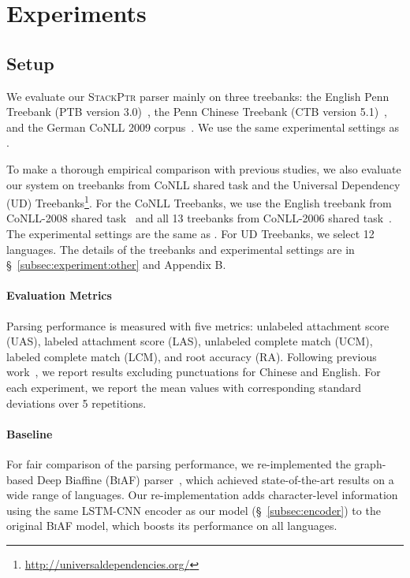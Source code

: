 \documentclass[11pt,a4paper]{article}
\begin{document}
\section{Experiments}\label{sec:experiment}
\subsection{Setup}
We evaluate our \textsc{StackPtr} parser mainly on three treebanks: the English Penn Treebank (PTB version 3.0)~\citep{Marcus:1993}, the Penn Chinese Treebank (CTB version 5.1)~\cite{xue2002building}, and the German CoNLL 2009 corpus~\cite{hajivc2009conll}.
We use the same experimental settings as \citet{kuncoro-EtAl:2016:EMNLP2016}.

To make a thorough empirical comparison with previous studies, we also evaluate our system on treebanks  from CoNLL shared task and the Universal Dependency (UD) Treebanks\footnote{\url{http://universaldependencies.org/}}. 
For the CoNLL Treebanks, we use the English treebank from CoNLL-2008 shared task~\cite{surdeanu2008conll} and all 13 treebanks from CoNLL-2006 shared task~\cite{Buchholz:2006}.
The experimental settings are the same as \citet{ma-hovy:2015:EMNLP}.
For UD Treebanks, we select 12 languages. The details of the treebanks and experimental settings are in \S~\ref{subsec:experiment:other} and Appendix B.

\paragraph{Evaluation Metrics} Parsing performance is measured with five metrics: unlabeled attachment score (UAS), labeled attachment score (LAS), unlabeled complete match (UCM), labeled complete match (LCM), and root accuracy (RA).
Following previous work~\citep{kuncoro-EtAl:2016:EMNLP2016,dozat2017:ICLR}, we report results excluding punctuations for Chinese and English.
For each experiment, we report the mean values with corresponding standard deviations over 5 repetitions.

\paragraph{Baseline} For fair comparison of the parsing performance, we re-implemented the graph-based Deep Biaffine (\textsc{BiAF}) parser~\citep{dozat2017:ICLR}, which achieved state-of-the-art results on a wide range of languages. 
Our re-implementation adds character-level information using the same LSTM-CNN encoder  as our model (\S~\ref{subsec:encoder}) to the original \textsc{BiAF} model, which boosts its performance on all languages.
\end{document}
